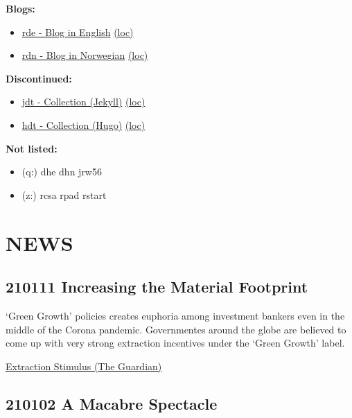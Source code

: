 \documentclass[
]{book}
\providecommand{\tightlist}{%
  \setlength{\itemsep}{0pt}\setlength{\parskip}{0pt}}
\begin{document}
\textbf{Blogs:}

\begin{itemize}
\tightlist
\item
  \href{https://dyrehaugen.github.io/rde}{rde - Blog in English} \href{http://localhost/rde}{(loc)}
\item
  \href{https://dyrehaugen.github.io/rdn}{rdn - Blog in Norwegian} \href{http://localhost/rdn}{(loc)}
\end{itemize}

\textbf{Discontinued:}

\begin{itemize}
\tightlist
\item
  \href{https://dyrehaugen.github.io/jdt}{jdt - Collection (Jekyll)} \href{http://localhost/jdt}{(loc)}
\item
  \href{https://dyrehaugen.github.io/hdt}{hdt - Collection (Hugo)} \href{http://localhost/hdt}{(loc)}
\end{itemize}

\textbf{Not listed:}

\begin{itemize}
\tightlist
\item
  (q:) dhe dhn jrw56
\item
  (z:) rcsa rpad rstart
\end{itemize}

\hypertarget{news}{%
\chapter{NEWS}\label{news}}

\hypertarget{increasing-the-material-footprint}{%
\section{210111 Increasing the Material Footprint}\label{increasing-the-material-footprint}}

`Green Growth' policies creates euphoria among investment bankers
even in the middle of the Corona pandemic.
Governmentes around the globe are believed to come up with very
strong extraction incentives under the `Green Growth' label.

\href{https://www.theguardian.com/business/2021/jan/10/green-economy-plans-fuel-new-metals-and-energy-supercycle}{Extraction Stimulus (The Guardian)}

\hypertarget{a-macabre-spectacle}{%
\section{210102 A Macabre Spectacle}\label{a-macabre-spectacle}}
\end{document}

